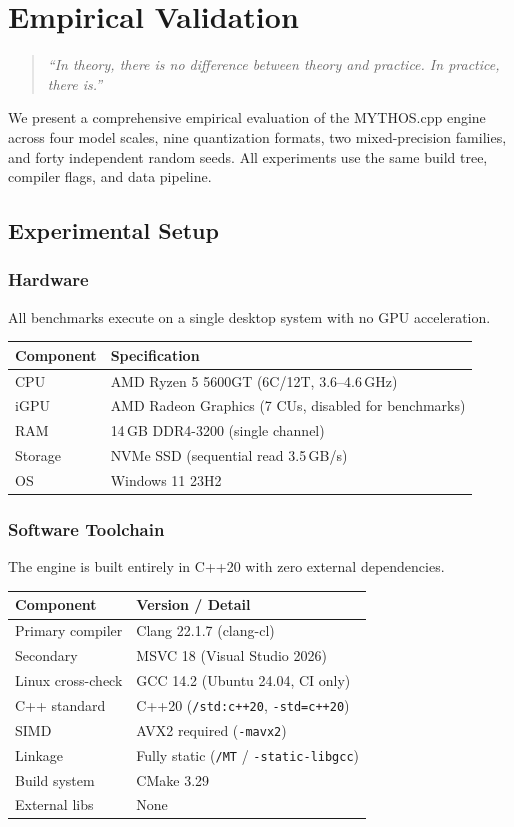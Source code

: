 \chapter{Empirical Validation}
\label{ch:empirical_results}
\begin{quote}
\textit{``In theory, there is no difference between theory and practice. In practice, there is.''}
\end{quote}
We present a comprehensive empirical evaluation of the MYTHOS.cpp engine across four model
scales, nine quantization formats, two mixed-precision families, and forty independent random
seeds. All experiments use the same build tree, compiler flags, and data pipeline.
\section{Experimental Setup}
\label{sec:setup}
\subsection{Hardware}
All benchmarks execute on a single desktop system with no GPU acceleration.
\begin{center}
\begin{tabular}{ll}
\toprule
\textbf{Component} & \textbf{Specification} \\
\midrule
CPU        & AMD Ryzen 5 5600GT (6C/12T, 3.6--4.6\,GHz) \\
iGPU       & AMD Radeon Graphics (7 CUs, disabled for benchmarks) \\
RAM        & 14\,GB DDR4-3200 (single channel) \\
Storage    & NVMe SSD (sequential read 3.5\,GB/s) \\
OS         & Windows 11 23H2 \\
\bottomrule
\end{tabular}
\end{center}
\subsection{Software Toolchain}
The engine is built entirely in C++20 with zero external dependencies.
\begin{center}
\begin{tabular}{ll}
\toprule
\textbf{Component} & \textbf{Version / Detail} \\
\midrule
Primary compiler  & Clang 22.1.7 (clang-cl) \\
Secondary         & MSVC 18 (Visual Studio 2026) \\
Linux cross-check & GCC 14.2 (Ubuntu 24.04, CI only) \\
C++ standard      & C++20 (\texttt{/std:c++20}, \texttt{-std=c++20}) \\
SIMD              & AVX2 required (\texttt{-mavx2}) \\
Linkage           & Fully static (\texttt{/MT} / \texttt{-static-libgcc}) \\
Build system      & CMake 3.29 \\
External libs     & None \\
\bottomrule
\end{tabular}
\end{center}
